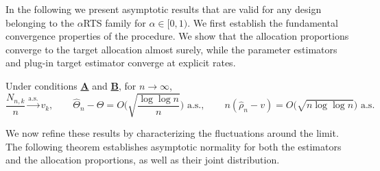 In the following we present asymptotic results that are valid for any design belonging to the \(\alpha\)RTS family for \(\alpha \in [0,1)\). We first establish the fundamental convergence properties of the procedure. We show that the allocation proportions converge to the target allocation almost surely, while the parameter estimators and plug-in target estimator converge at explicit rates.

\begin{theorem}\label{thm:LLN}
	Under conditions \hyperlink{CA}{\textbf{A}} and \hyperlink{CB}{\textbf{B}}, for \(n \to \infty\),
	\[
	\frac{N_{n,k}}{n}\xrightarrow{\text{a.s.}}v_k,\qquad
	\hat\Theta_n-\Theta = O\!\Big(\sqrt{\frac{\log\log n}{n}}\Big)\text{ a.s.},\qquad
	n(\hat\rho_n-v)=O\!\big(\sqrt{n\log\log n}\big)\text{ a.s.}
	\]
\end{theorem}

%



We now refine these results by characterizing the fluctuations around the limit. The following theorem establishes asymptotic normality for both the estimators and the allocation proportions, as well as their joint distribution.


